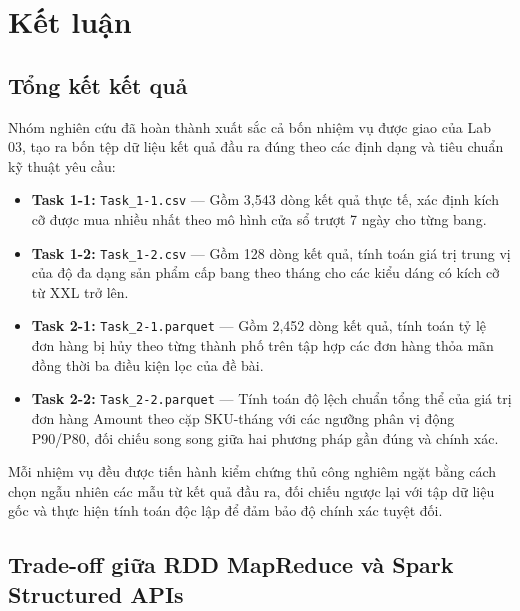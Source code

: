 \section{Kết luận}

\subsection{Tổng kết kết quả}

Nhóm nghiên cứu đã hoàn thành xuất sắc cả bốn nhiệm vụ được giao của Lab 03, tạo ra bốn tệp dữ liệu kết quả đầu ra đúng theo các định dạng và tiêu chuẩn kỹ thuật yêu cầu:

\begin{itemize}
    \item \textbf{Task 1-1:} \texttt{Task\_1-1.csv} --- Gồm 3,543 dòng kết quả thực tế, xác định kích cỡ được mua nhiều nhất theo mô hình cửa sổ trượt 7 ngày cho từng bang.
    \item \textbf{Task 1-2:} \texttt{Task\_1-2.csv} --- Gồm 128 dòng kết quả, tính toán giá trị trung vị của độ đa dạng sản phẩm cấp bang theo tháng cho các kiểu dáng có kích cỡ từ XXL trở lên.
    \item \textbf{Task 2-1:} \texttt{Task\_2-1.parquet} --- Gồm 2,452 dòng kết quả, tính toán tỷ lệ đơn hàng bị hủy theo từng thành phố trên tập hợp các đơn hàng thỏa mãn đồng thời ba điều kiện lọc của đề bài.
    \item \textbf{Task 2-2:} \texttt{Task\_2-2.parquet} --- Tính toán độ lệch chuẩn tổng thể của giá trị đơn hàng Amount theo cặp SKU-tháng với các ngưỡng phân vị động P90/P80, đối chiếu song song giữa hai phương pháp gần đúng và chính xác.
\end{itemize}

Mỗi nhiệm vụ đều được tiến hành kiểm chứng thủ công nghiêm ngặt bằng cách chọn ngẫu nhiên các mẫu từ kết quả đầu ra, đối chiếu ngược lại với tập dữ liệu gốc và thực hiện tính toán độc lập để đảm bảo độ chính xác tuyệt đối.

\subsection{Trade-off giữa RDD MapReduce và Spark Structured APIs}

